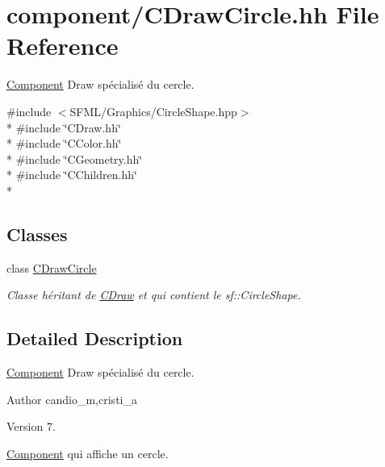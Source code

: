 \hypertarget{_c_draw_circle_8hh}{}\section{component/\+C\+Draw\+Circle.hh File Reference}
\label{_c_draw_circle_8hh}


\hyperlink{class_component}{Component} Draw spécialisé du cercle.  


{\ttfamily \#include $<$S\+F\+M\+L/\+Graphics/\+Circle\+Shape.\+hpp$>$}\\*
{\ttfamily \#include \char`\"{}C\+Draw.\+hh\char`\"{}}\\*
{\ttfamily \#include \char`\"{}C\+Color.\+hh\char`\"{}}\\*
{\ttfamily \#include \char`\"{}C\+Geometry.\+hh\char`\"{}}\\*
{\ttfamily \#include \char`\"{}C\+Children.\+hh\char`\"{}}\\*
\subsection*{Classes}
\begin{DoxyCompactItemize}
\item 
class \hyperlink{class_c_draw_circle}{C\+Draw\+Circle}
\begin{DoxyCompactList}\small\item\em Classe héritant de \hyperlink{class_c_draw}{C\+Draw} et qui contient le sf\+::\+Circle\+Shape. \end{DoxyCompactList}\end{DoxyCompactItemize}


\subsection{Detailed Description}
\hyperlink{class_component}{Component} Draw spécialisé du cercle. 

\begin{DoxyAuthor}{Author}
candio\+\_\+m,cristi\+\_\+a 
\end{DoxyAuthor}
\begin{DoxyVersion}{Version}
7.
\end{DoxyVersion}
\hyperlink{class_component}{Component} qui affiche un cercle. 